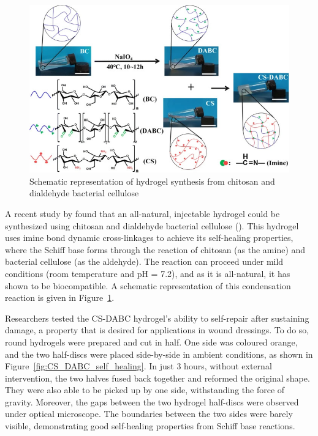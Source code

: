 \begin{figure}[hb]
    \centering 
    \includegraphics[width=0.7\linewidth]{Figures/CS_DABC_condensation.jpg}
    \caption{Schematic representation of hydrogel synthesis from chitosan and dialdehyde bacterial cellulose \autocite{liAllnaturalInjectableHydrogel2020}}
    \label{fig:CS_DABC_condensation}
\end{figure}

A recent study by \citeauthor{liAllnaturalInjectableHydrogel2020} found that an all-natural, injectable hydrogel could be synthesized using chitosan and dialdehyde bacterial cellulose (\citeyear{liAllnaturalInjectableHydrogel2020}). This hydrogel uses imine bond dynamic cross-linkages to achieve its self-healing properties, where the Schiff base forms through the reaction of chitosan (as the amine) and bacterial cellulose (as the aldehyde).
The reaction can proceed under mild conditions (room temperature and pH = 7.2), and as it is all-natural, it has shown to be biocompatible. A schematic representation of this condensation reaction is given in Figure~\ref{fig:CS_DABC_condensation}.

Researchers tested the CS-DABC hydrogel's ability to self-repair after sustaining damage, a property that is desired for applications in wound dressings. To do so, round hydrogels were prepared and cut in half. One side was coloured orange, and the two half-discs were placed side-by-side in ambient conditions, as shown in Figure~\ref{fig:CS_DABC_self_healing}.
In just 3 hours, without external intervention, the two halves fused back together and reformed the original shape. They were also able to be picked up by one side, withstanding the force of gravity. Moreover, the gaps between the two hydrogel half-discs were observed under optical microscope.
The boundaries between the two sides were barely visible, demonstrating good self-healing properties from Schiff base reactions.

